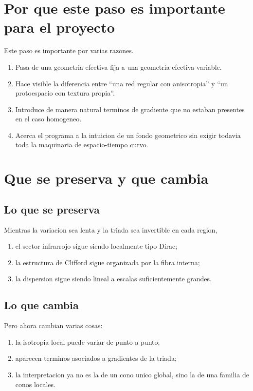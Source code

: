 \section{Por que este paso es importante para el proyecto}
Este paso es importante por varias razones.

\begin{enumerate}[label=\arabic*.]
    \item Pasa de una geometria efectiva fija a una geometria efectiva variable.
    \item Hace visible la diferencia entre \enquote{una red regular con anisotropia} y \enquote{un protoespacio con textura propia}.
    \item Introduce de manera natural terminos de gradiente que no estaban presentes en el caso homogeneo.
    \item Acerca el programa a la intuicion de un fondo geometrico sin exigir todavia toda la maquinaria de espacio-tiempo curvo.
\end{enumerate}

\section{Que se preserva y que cambia}
\subsection{Lo que se preserva}
Mientras la variacion sea lenta y la triada sea invertible en cada region,
\begin{enumerate}[label=\arabic*.]
    \item el sector infrarrojo sigue siendo localmente tipo Dirac;
    \item la estructura de Clifford sigue organizada por la fibra interna;
    \item la dispersion sigue siendo lineal a escalas suficientemente grandes.
\end{enumerate}

\subsection{Lo que cambia}
Pero ahora cambian varias cosas:
\begin{enumerate}[label=\arabic*.]
    \item la isotropia local puede variar de punto a punto;
    \item aparecen terminos asociados a gradientes de la triada;
    \item la interpretacion ya no es la de un cono unico global, sino la de una familia de conos locales.
\end{enumerate}

